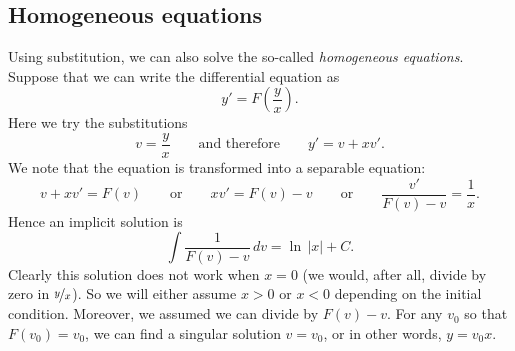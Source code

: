 \subsection{Homogeneous equations}

Using substitution, we can also solve the
so-called \emph{homogeneous equations}.
Suppose that we can write the differential equation as
\begin{equation*}
y' = F\left(\frac{y}{x}\right) .
\end{equation*}
Here we try the substitutions
\begin{equation*}
v = \frac{y}{x} \qquad \text{and therefore} \qquad y' = v + x v' .
\end{equation*}
We note that the equation is transformed into
a separable equation:
\begin{equation*}
v+ xv' = F(v) \qquad \text{or} \qquad xv' = F(v)-v
\qquad \text{or} \qquad \frac{v'}{F(v)-v} = \frac{1}{x} .
\end{equation*}
Hence an implicit solution is
\begin{equation*}
\int \frac{1}{F(v)-v} \,dv = \ln \, \lvert x \rvert + C .
\end{equation*}
Clearly this solution does not work when $x = 0$ (we would, after all,
divide by zero in $\nicefrac{y}{x}$).  So we will either assume $x > 0$
or $x < 0$ depending on the initial condition.
Moreover, we assumed we can divide by $F(v)-v$.
For any $v_0$ so that
$F(v_0)=v_0$, we can find a singular solution $v=v_0$,
or in other words, $y = v_0 x$.


